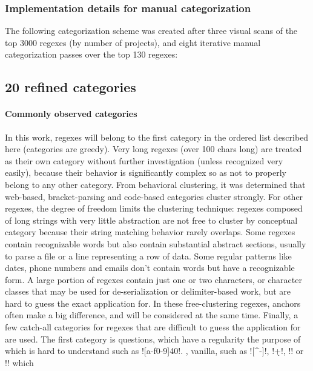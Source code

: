 \subsubsection{Implementation details for manual categorization}
The following categorization scheme was created after three visual scans of the top 3000 regexes (by number of projects), and eight iterative manual categorization passes over the top 130 regexes:

\subsection{20 refined categories}
\label{sec:20refinedCategories}

\paragraph{Commonly observed categories} In this work, regexes will belong to the first category in the ordered list described here (categories are greedy).  Very long regexes (over 100 chars long) are treated as their own category without further investigation (unless recognized very easily), because their behavior is significantly complex so as not to properly belong to any other category.  From behavioral clustering, it was determined that web-based, bracket-parsing and code-based categories cluster strongly.  For other regexes, the degree of freedom limits the clustering technique: regexes composed of long strings with very little abstraction are not free to cluster by conceptual category because their string matching behavior rarely overlaps.  Some regexes contain recognizable words but also contain substantial abstract sections, usually to parse a file or a line representing a row of data.  Some regular patterns like dates, phone numbers and emails don't contain words but have a recognizable form.  A large portion of regexes contain just one or two characters, or character classes that may be used for de-serialization or delimiter-based work, but are hard to guess the exact application for.  In these free-clustering regexes, anchors often make a big difference, and will be considered at the same time.  Finally, a few catch-all categories for regexes that are difficult to guess the application for are used.  The first category is questions, which have a regularity the purpose of which is hard to understand such as \cverb![a-f0-9]{40}!.  , vanilla, such as \cverb![^\w\s-]!, \cverb!\d+!, \cverb!! or \cverb!! which


